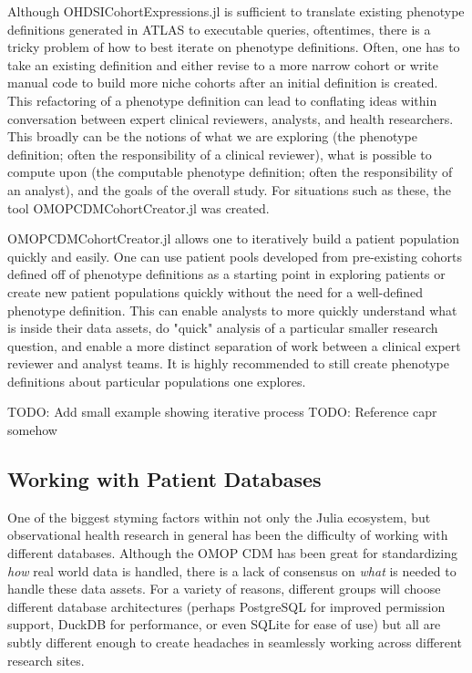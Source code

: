 \documentclass{juliacon}
\begin{document}
Although OHDSICohortExpressions.jl is sufficient to translate existing phenotype definitions generated in ATLAS to executable queries, oftentimes, there is a tricky problem of how to best iterate on phenotype definitions. \cite{zelkoDevelopingRobustComputable2023}
Often, one has to take an existing definition and either revise to a more narrow cohort or write manual code to build more niche cohorts after an initial definition is created.
This refactoring of a phenotype definition can lead to conflating ideas within conversation between expert clinical reviewers, analysts, and health researchers.
This broadly can be the notions of what we are exploring (the phenotype definition; often the responsibility of a clinical reviewer), what is possible to compute upon (the computable phenotype definition; often the responsibility of an analyst), and the goals of the overall study.
For situations such as these, the tool OMOPCDMCohortCreator.jl was created.

OMOPCDMCohortCreator.jl allows one to iteratively build a patient population quickly and easily.
One can use patient pools developed from pre-existing cohorts defined off of phenotype definitions as a starting point in exploring patients or create new patient populations quickly without the need for a well-defined phenotype definition.
This can enable analysts to more quickly understand what is inside their data assets, do "quick" analysis of a particular smaller research question, and enable a more distinct separation of work between a clinical expert reviewer and analyst teams.
It is highly recommended to still create phenotype definitions about particular populations one explores.

TODO: Add small example showing iterative process 
TODO: Reference capr somehow

\subsection{Working with Patient Databases}

One of the biggest styming factors within not only the Julia ecosystem, but observational health research in general has been the difficulty of working with different databases.
Although the OMOP CDM has been great for standardizing \textit{how} real world data is handled, there is a lack of consensus on \textit{what} is needed to handle these data assets.
For a variety of reasons, different groups will choose different database architectures (perhaps PostgreSQL for improved permission support, DuckDB for performance, or even SQLite for ease of use) but all are subtly different enough to create headaches in seamlessly working across different research sites.
\end{document}
